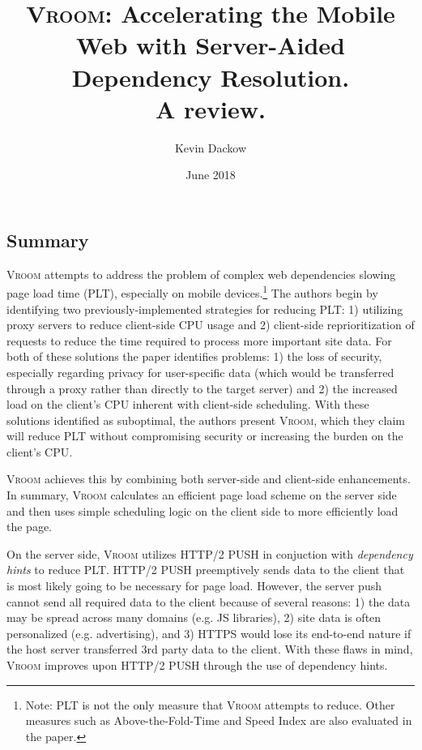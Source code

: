\documentclass[10pt,letterpaper]{article}
\title{\textsc{Vroom}: Accelerating the Mobile Web with Server-Aided Dependency Resolution. \\ \textbf{A review.}}
\author{Kevin Dackow}
\date{June 2018}
\begin{document}
		\maketitle
\begin{multicols*}{2}[]
		\section{Summary}
            \textsc{Vroom} attempts to address the problem of complex web dependencies slowing page load time (PLT), especially on mobile devices.\footnote{Note: PLT is not the only measure that \textsc{Vroom} attempts to reduce. Other measures such as Above-the-Fold-Time and Speed Index are also evaluated in the paper.} The authors begin by identifying two previously-implemented strategies for reducing PLT: 1) utilizing proxy servers to reduce client-side CPU usage and 2) client-side reprioritization of requests to reduce the time required to process more important site data. For both of these solutions the paper identifies problems: 1) the loss of security, especially regarding privacy for user-specific data (which would be transferred through a proxy rather than directly to the target server) and 2) the increased load on the client's CPU inherent with client-side scheduling. With these solutions identified as suboptimal, the authors present \textsc{Vroom}, which they claim will reduce PLT without compromising security or increasing the burden on the client's CPU.

            \textsc{Vroom} achieves this by combining both server-side and client-side enhancements. In summary, \textsc{Vroom} calculates an efficient page load scheme on the server side and then uses simple scheduling logic on the client side to more efficiently load the page.
            
            On the server side, \textsc{Vroom} utilizes HTTP/2 PUSH in conjuction with \textit{dependency hints} to reduce PLT. HTTP/2 PUSH preemptively sends data to the client that is most likely going to be necessary for page load. However, the server push cannot send all required data to the client because of several reasons: 1) the data may be spread across many domains (e.g. JS libraries), 2) site data is often personalized (e.g. advertising), and 3) HTTPS would lose its end-to-end nature if the host server transferred 3rd party data to the client. With these flaws in mind, \textsc{Vroom} improves upon HTTP/2 PUSH through the use of dependency hints.
			

\end{multicols*}
\end{document}
